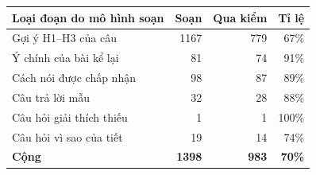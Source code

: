 \small
\begin{tabular}{@{}lrrr@{}}
\toprule
Loại đoạn do mô hình soạn & Soạn & Qua kiểm & Tỉ lệ \\
\midrule
Gợi ý H1--H3 của câu & 1167 & 779 & 67\% \\
Ý chính của bài kể lại & 81 & 74 & 91\% \\
Cách nói được chấp nhận & 98 & 87 & 89\% \\
Câu trả lời mẫu & 32 & 28 & 88\% \\
Câu hỏi giải thích thiếu & 1 & 1 & 100\% \\
Câu hỏi vì sao của tiết & 19 & 14 & 74\% \\
\midrule
\textbf{Cộng} & \textbf{1398} & \textbf{983} & \textbf{70\%} \\
\bottomrule
\end{tabular}
